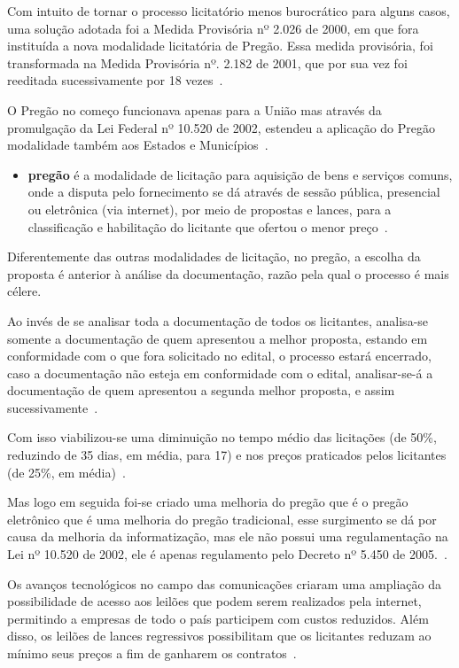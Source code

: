 Com intuito de tornar o processo licitatório menos burocrático para alguns casos, uma solução adotada foi a Medida Provisória nº 2.026 de 2000, em que fora instituída a nova modalidade licitatória de Pregão. 
Essa medida provisória, foi transformada na Medida Provisória nº. 2.182 de 2001, que por sua vez foi reeditada sucessivamente por 18 vezes~\cite{ribeiro2007evoluccao}. 

O Pregão no começo funcionava apenas para a União mas através da promulgação da Lei Federal nº 10.520 de 2002, estendeu a aplicação do Pregão modalidade também aos Estados e Municípios~\cite{ribeiro2007evoluccao}.

\begin{itemize}
    \item \textbf{pregão} é a modalidade de licitação para aquisição de bens e serviços comuns, onde a disputa pelo fornecimento se dá através de sessão pública, presencial ou eletrônica (via internet), por meio de propostas e lances, para a classificação e habilitação do licitante que ofertou o menor preço~\cite{barreto2008licitaccoes}.
\end{itemize}

Diferentemente das outras modalidades de licitação, no pregão, a escolha da proposta é anterior à análise da documentação, razão pela qual o processo é mais célere. 

Ao invés de se analisar toda a documentação de todos os licitantes, analisa-se somente a documentação de quem apresentou a melhor proposta, estando em conformidade com o que fora solicitado no edital, o processo estará encerrado, caso a documentação não esteja em conformidade com o edital, analisar-se-á a documentação de quem apresentou a segunda melhor proposta, e assim sucessivamente~\cite{gasparini2017direito}.

Com isso viabilizou-se uma diminuição no tempo médio das licitações (de 50\%, reduzindo de 35 dias, em média, para 17)
e nos preços praticados pelos licitantes (de 25\%, em média)~\cite{mello2016licitaccao}. 

Mas logo em seguida foi-se criado uma melhoria do pregão que é o pregão eletrônico que é uma melhoria do pregão tradicional, esse surgimento se dá por causa da melhoria da informatização, mas ele não possui uma regulamentação na Lei nº 10.520 de 2002, ele é apenas regulamento pelo Decreto nº 5.450 de 2005.~\cite{dapregao}.

Os avanços tecnológicos no campo das comunicações criaram uma ampliação da possibilidade de acesso aos leilões que podem serem realizados pela internet, permitindo a empresas de todo o país participem com custos reduzidos.
Além disso, os leilões de lances regressivos possibilitam que os licitantes reduzam ao mínimo seus preços a fim de ganharem os contratos~\cite{mello2016licitaccao}.


